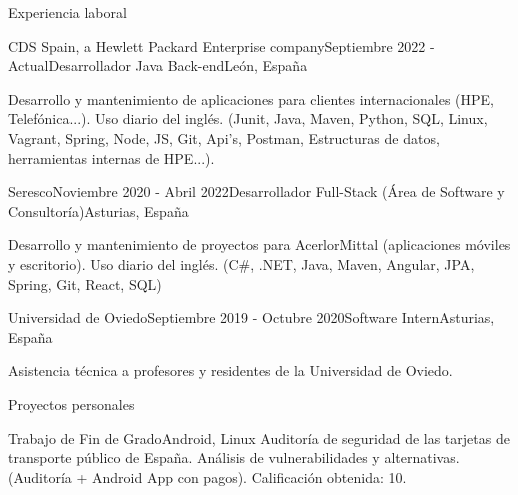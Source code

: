 \documentclass{resume} %
\begin{document}

\begin{rSection}{Experiencia laboral}

\begin{rSubsection}{CDS Spain, a Hewlett Packard Enterprise company}{Septiembre 2022 - Actual}{Desarrollador Java Back-end}{León, España}
\item Desarrollo y mantenimiento de aplicaciones para clientes internacionales (HPE, Telefónica...). Uso diario del inglés. (Junit, Java, Maven, Python, SQL, Linux, Vagrant, Spring, Node, JS, Git, Api's, Postman, Estructuras de datos, herramientas internas de HPE...).
\end{rSubsection}

\begin{rSubsection}{Seresco}{Noviembre 2020 - Abril 2022}{Desarrollador Full-Stack (Área de Software y Consultoría)}{Asturias, España}
\item Desarrollo y mantenimiento de proyectos para AcerlorMittal (aplicaciones móviles y escritorio). Uso diario del inglés. (C\#, .NET, Java, Maven, Angular, JPA, Spring, Git, React, SQL)
\end{rSubsection}

\begin{rSubsection}{Universidad de Oviedo}{Septiembre 2019 - Octubre 2020}{Software Intern}{Asturias, España}
\item Asistencia técnica a profesores y residentes de la Universidad de Oviedo.
\end{rSubsection}

\end{rSection}


\begin{rSection}{Proyectos personales}
\begin{rSubsection}{{Trabajo de Fin de Grado}}{Android, Linux}{}{}
Auditoría de seguridad de las tarjetas de transporte público de España. Análisis de vulnerabilidades y alternativas. (Auditoría + Android App con pagos).
Calificación obtenida: 10.
\end{rSubsection}
\end{rSection}
\end{document}
